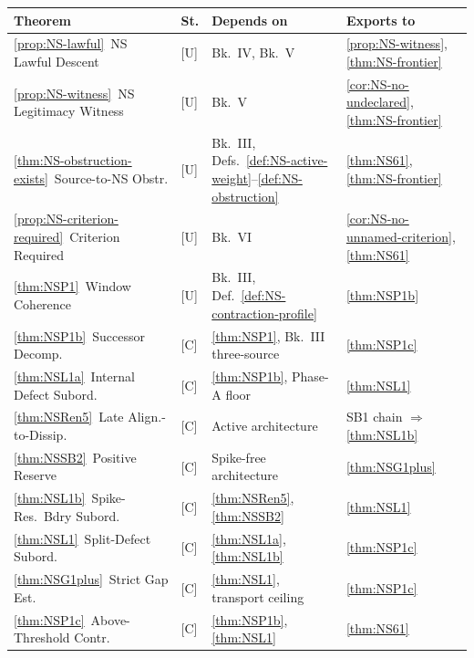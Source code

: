 \documentclass[12pt,oneside]{amsbook}
\theoremstyle{plain}
\theoremstyle{definition}
\theoremstyle{remark}
\begin{document}
\begin{tabular}{@{}p{3.8cm}p{0.8cm}p{3.2cm}p{5.2cm}@{}}
\hline
\textbf{Theorem} & \textbf{St.} & \textbf{Depends on}
 & \textbf{Exports to} \\
\hline
\ref{prop:NS-lawful}\ NS Lawful Descent
 & [U] & Bk.~IV, Bk.~V
 & \ref{prop:NS-witness}, \ref{thm:NS-frontier} \\

\ref{prop:NS-witness}\ NS Legitimacy Witness
 & [U] & Bk.~V
 & \ref{cor:NS-no-undeclared}, \ref{thm:NS-frontier} \\

\ref{thm:NS-obstruction-exists}\ Source-to-NS Obstr.
 & [U] & Bk.~III, Defs.~\ref{def:NS-active-weight}--\ref{def:NS-obstruction}
 & \ref{thm:NS61}, \ref{thm:NS-frontier} \\

\ref{prop:NS-criterion-required}\ Criterion Required
 & [U] & Bk.~VI
 & \ref{cor:NS-no-unnamed-criterion}, \ref{thm:NS61} \\

\ref{thm:NSP1}\ Window Coherence
 & [U] & Bk.~III, Def.~\ref{def:NS-contraction-profile}
 & \ref{thm:NSP1b} \\

\ref{thm:NSP1b}\ Successor Decomp.
 & [C] & \ref{thm:NSP1}, Bk.~III three-source
 & \ref{thm:NSP1c} \\

\ref{thm:NSL1a}\ Internal Defect Subord.
 & [C] & \ref{thm:NSP1b}, Phase-A floor
 & \ref{thm:NSL1} \\

\ref{thm:NSRen5}\ Late Align.-to-Dissip.
 & [C] & Active architecture
 & SB1 chain $\Rightarrow$ \ref{thm:NSL1b} \\

\ref{thm:NSSB2}\ Positive Reserve
 & [C] & Spike-free architecture
 & \ref{thm:NSG1plus} \\

\ref{thm:NSL1b}\ Spike-Res.\ Bdry Subord.
 & [C] & \ref{thm:NSRen5}, \ref{thm:NSSB2}
 & \ref{thm:NSL1} \\

\ref{thm:NSL1}\ Split-Defect Subord.
 & [C] & \ref{thm:NSL1a}, \ref{thm:NSL1b}
 & \ref{thm:NSP1c} \\

\ref{thm:NSG1plus}\ Strict Gap Est.
 & [C] & \ref{thm:NSL1}, transport ceiling
 & \ref{thm:NSP1c} \\

\ref{thm:NSP1c}\ Above-Threshold Contr.
 & [C] & \ref{thm:NSP1b}, \ref{thm:NSL1}
 & \ref{thm:NS61} \\


\end{tabular}
\end{document}
